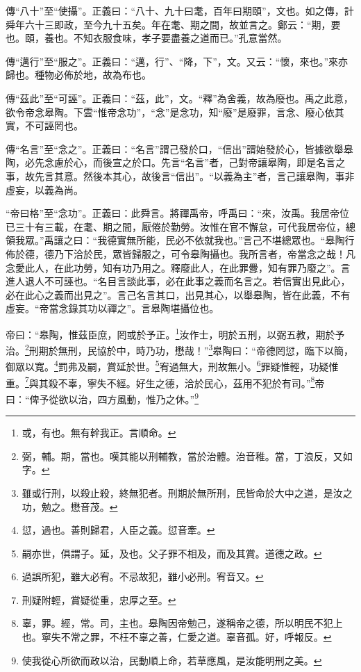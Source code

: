 {\noindent\zhuan{}\fzbyks 傳“八十”至“使攝”。正義曰：“八十、九十曰耄，百年曰期頤”，文也。如之傳，計舜年六十三即政，至今九十五矣。年在耄、期之間，故並言之。鄭云：“期，要也。頤，養也。不知衣服食味，孝子要盡養之道而已。”孔意當然。 \par}

{\noindent\zhuan{}\fzbyks 傳“邁行”至“服之”。正義曰：“邁，行”、“降，下”，文。又云：“懷，來也。”來亦歸也。種物必佈於地，故為布也。 \par}

{\noindent\zhuan{}\fzbyks 傳“茲此”至“可誣”。正義曰：“茲，此”，文。“釋”為舍義，故為廢也。禹之此意，欲令帝念皋陶。下雲“惟帝念功”，“念”是念功，知“廢”是廢罪，言念、廢心依其實，不可誣罔也。 \par}

{\noindent\zhuan{}\fzbyks 傳“名言”至“念之”。正義曰：“名言”謂己發於口，“信出”謂始發於心，皆據欲舉皋陶，必先念慮於心，而後宣之於口。先言“名言”者，己對帝讓皋陶，即是名言之事，故先言其意。然後本其心，故後言“信出”。“以義為主”者，言己讓皋陶，事非虛妄，以義為尚。 \par}

{\noindent\shu{}\fzkt “帝曰格”至“念功”。正義曰：此舜言。將禪禹帝，呼禹曰：“來，汝禹。我居帝位已三十有三載，在耄、期之間，厭倦於勤勞。汝惟在官不懈怠，可代我居帝位，總領我眾。”禹讓之曰：“我德實無所能，民必不依就我也。”言己不堪總眾也。“皋陶行佈於德，德乃下洽於民，眾皆歸服之，可令皋陶攝也。我所言者，帝當念之哉！凡念愛此人，在此功勞，知有功乃用之。釋廢此人，在此罪釁，知有罪乃廢之”。言進人退人不可誣也。“名目言談此事，必在此事之義而名言之。若信實出見此心，必在此心之義而出見之”。言己名言其口，出見其心，以舉皋陶，皆在此義，不有虛妄。“帝當念錄其功以禪之”。言皋陶堪攝位也。 \par}

帝曰：“皋陶，惟茲臣庶，罔或於予正。\footnote{或，有也。無有幹我正。言順命。}汝作士，明於五刑，以弼五教，期於予治。\footnote{弼，輔。期，當也。嘆其能以刑輔教，當於治體。治音稚。當，丁浪反，又如字。}刑期於無刑，民協於中，時乃功，懋哉！”\footnote{雖或行刑，以殺止殺，終無犯者。刑期於無所刑，民皆命於大中之道，是汝之功，勉之。懋音茂。}皋陶曰：“帝德罔愆，臨下以簡，御眾以寬。\footnote{愆，過也。善則歸君，人臣之義。愆音牽。}罰弗及嗣，賞延於世。\footnote{嗣亦世，俱謂子。延，及也。父子罪不相及，而及其賞。道德之政。}宥過無大，刑故無小。\footnote{過誤所犯，雖大必宥。不忌故犯，雖小必刑。宥音又。}罪疑惟輕，功疑惟重。\footnote{刑疑附輕，賞疑從重，忠厚之至。}與其殺不辜，寧失不經。好生之德，洽於民心，茲用不犯於有司。”\footnote{辜，罪。經，常。司，主也。皋陶因帝勉己，遂稱帝之德，所以明民不犯上也。寧失不常之罪，不枉不辜之善，仁愛之道。辜音孤。好，呼報反。}帝曰：“俾予從欲以治，四方風動，惟乃之休。”\footnote{使我從心所欲而政以治，民動順上命，若草應風，是汝能明刑之美。}

